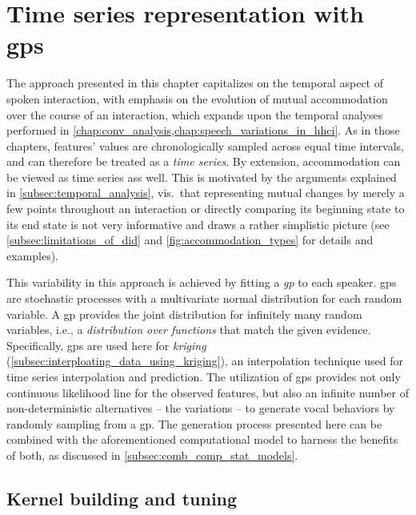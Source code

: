 \section{Time series representation with \aclp{gp}}
\label{sec:time_series_analysis}

The approach presented in this chapter capitalizes on the temporal aspect of spoken interaction, with emphasis on the evolution of mutual accommodation over the course of an interaction, which expands upon the temporal analyses performed in \cref{chap:conv_analysis,chap:speech_variations_in_hhci}.
As in those chapters, features' values are chronologically sampled across equal time intervals, and can therefore be treated as a \emph{time series}.
By extension, accommodation can be viewed as time series ass well.
This is motivated by the arguments explained in \cref{subsec:temporal_analysis}, vis.\ that representing mutual changes by merely a few points throughout an interaction or directly comparing its beginning state to its end state is not very informative and draws a rather simplistic picture (see \cref{subsec:limitations_of_did} and \cref{fig:accommodation_types} for details and examples).

This variability in this approach is achieved by fitting a \emph{\ac{gp}} to each speaker.
\Acp{gp} are stochastic processes with a multivariate normal distribution for each random variable.
A \ac{gp} provides the joint distribution for infinitely many random variables, i.e., a \emph{distribution over functions} that match the given evidence.
Specifically, \acp{gp} are used here for \emph{kriging} (\cref{subsec:interploating_data_using_kriging}), an interpolation technique used for time series interpolation and prediction.
The utilization of \acp{gp} provides not only continuous likelihood line for the observed features, but also an infinite number of non-deterministic alternatives -- the variations -- to generate vocal behaviors by randomly sampling from a \ac{gp}.
The generation process presented here can be combined with the aforementioned computational model to harness the benefits of both, as discussed in \cref{subsec:comb_comp_stat_models}.

\subsection{Kernel building and tuning}
\label{subsec:covariance_functions}

